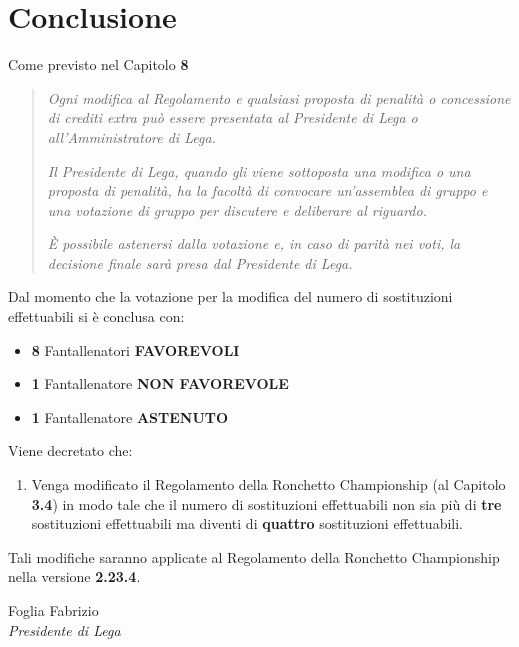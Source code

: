 \documentclass[12pt]{article}
\begin{document}
\newpage
\section*{Conclusione}
Come previsto nel Capitolo \textbf{8}

\begin{quote}
\textit{    Ogni modifica al Regolamento e qualsiasi proposta di penalità o concessione di crediti extra può essere presentata al Presidente di Lega o all'Amministratore di Lega.}

\textit{Il Presidente di Lega, quando gli viene sottoposta una modifica o una proposta di penalità, ha la facoltà di convocare un'assemblea di gruppo e una votazione di gruppo per discutere e deliberare al riguardo.}

\textit{È possibile astenersi dalla votazione e, in caso di parità nei voti, la decisione finale sarà presa dal Presidente di Lega.}
\end{quote}

Dal momento che la votazione per la modifica del numero di sostituzioni effettuabili si è conclusa con:
\begin{itemize}
    \item \textbf{8} Fantallenatori \textbf{FAVOREVOLI}
    \item \textbf{1} Fantallenatore \textbf{NON FAVOREVOLE}
    \item \textbf{1} Fantallenatore \textbf{ASTENUTO}
\end{itemize}

Viene decretato che:
\begin{enumerate}
    \item Venga modificato il Regolamento della Ronchetto Championship (al Capitolo \textbf{3.4}) in modo tale che il numero di sostituzioni effettuabili non sia più di \textbf{tre} sostituzioni effettuabili ma diventi di \textbf{quattro} sostituzioni effettuabili.
\end{enumerate}

Tali modifiche saranno applicate al Regolamento della Ronchetto Championship nella versione \textbf{2.23.4}. 

\begin{flushright}
    \vspace*{\fill}
    Foglia Fabrizio \\ \textit{Presidente di Lega}
    \vspace{0.5cm} %
\end{flushright}
    
\end{document}
